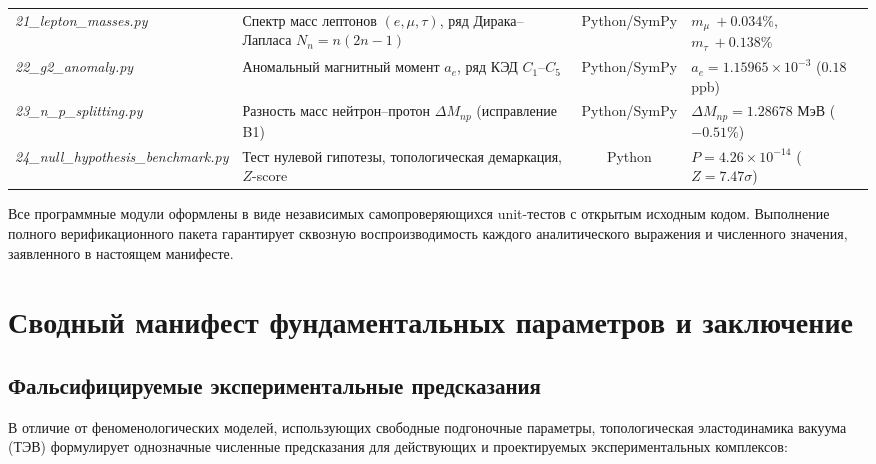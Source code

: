 \documentclass[11pt,a4paper]{article}
\theoremstyle{definition}
\theoremstyle{remark}
\begin{document}
\begin{table}[H]
\begin{tabularx}{\textwidth}{l p{5.5cm} c >{\raggedleft\arraybackslash}X}
\textit{21\_lepton\_masses.py} & Спектр масс лептонов $(e,\mu,\tau)$, ряд Дирака--Лапласа $N_n=n(2n-1)$ & Python/SymPy & $m_\mu\ +0.034\%$, $m_\tau\ +0.138\%$ \\
\textit{22\_g2\_anomaly.py} & Аномальный магнитный момент $a_e$, ряд КЭД $C_1\text{--}C_5$ & Python/SymPy & $a_e=1.15965\times10^{-3}$ ($0.18$ ppb) \\
\textit{23\_n\_p\_splitting.py} & Разность масс нейтрон--протон $\Delta M_{np}$ (исправление B1) & Python/SymPy & $\Delta M_{np}=1.28678$ МэВ ($-0.51\%$) \\
\textit{24\_null\_hypothesis\_benchmark.py} & Тест нулевой гипотезы, топологическая демаркация, $Z$-score & Python & $P=4.26\times10^{-14}$ ($Z=7.47\sigma$) \\
\bottomrule
\end{tabularx}
\end{table}

Все программные модули оформлены в виде независимых самопроверяющихся unit-тестов с открытым исходным кодом. Выполнение полного верификационного пакета гарантирует сквозную воспроизводимость каждого аналитического выражения и численного значения, заявленного в настоящем манифесте.


\section{Сводный манифест фундаментальных параметров и заключение}
\label{sec:master_manifest}

\subsection{Фальсифицируемые экспериментальные предсказания}
В отличие от феноменологических моделей, использующих свободные подгоночные параметры, топологическая эластодинамика вакуума (ТЭВ) формулирует однозначные численные предсказания для действующих и проектируемых экспериментальных комплексов:
\end{document}
